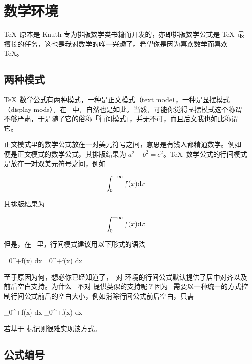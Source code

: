 \chapter{数学环境}

\TeX\ 原本是 Knuth 专为排版数学类书籍而开发的，亦即排版数学公式是 \TeX\ 最擅长的任务，这也是我对数学的唯一兴趣了。希望你是因为喜欢数学而喜欢 \TeX。

\section{两种模式}

\TeX\ 数学公式有两种模式，一种是正文模式（text mode），一种是显摆模式（display mode），在 \ConTeXt\ 中，自然也是如此。当然，可能你觉得显摆模式这个称谓不够严肃，于是随了它的俗称「行间模式」，并无不可，而且后文我也如此称谓它。

正文模式里的数学公式放在一对美元符号之间，意思是有钱人都精通数学。例如  便是正文模式的数学公式，其排版结果为 $a^2 + b^2 = c^2$。\TeX\ 数学公式的行间模式是放在一对双美元符号之间，例如

\starttyping[option=TEX]
$$
\int_0^{+\infty}f(x) {\rm d}x
$$
\stoptyping

\noindent 其排版结果为

$$
\int_0^{+\infty}f(x) {\rm d}x
$$

\noindent 但是，在 \ConTeXt\ 里，行间模式建议用以下形式的语法

\starttyping[option=TEX]
\startformula
\int_0^{+\infty}f(x) {\rm d}x
\stopformula
\stoptyping
\startformula
\int_0^{+\infty}f(x) {\rm d}x
\stopformula

\noindent 至于原因为何，想必你已经知道了，\ConTeXt\ 对  环境的行间公式默认提供了居中对齐以及前后空白支持。为什么 \ConTeXt\ 不对  提供类似的支持呢？因为 \ConTeXt\ 需要以一种统一的方式控制行间公式前后的空白大小，例如消除行间公式前后空白，只需

\starttyping[option=TEX]
\setupformulas[spacebefore=0pt,spaceafter=0pt]
\startformula
\int_0^{+\infty}f(x) {\rm d}x
\stopformula
\stoptyping
\setupformulas[spacebefore=0pt,spaceafter=0pt]
\startformula
\int_0^{+\infty}f(x) {\rm d}x
\stopformula

\noindent 若基于  标记则很难实现该方式。

\section{公式编号}

